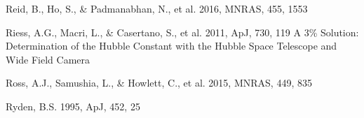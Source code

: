 \documentclass[iop]{emulateapj}
\begin{document}
\begin{thebibliography}{}

Reid, B., Ho, S., \& Padmanabhan, N., et al.  2016, MNRAS, 455, 1553


Riess, A.G., Macri, L., \& Casertano, S., et al. 2011, ApJ, 730, 119
A 3\% Solution: Determination of the Hubble Constant with the Hubble Space Telescope and Wide Field Camera


Ross, A.J., Samushia, L., \& Howlett, C., et al. 2015, MNRAS, 449, 835

Ryden, B.S. 1995, ApJ, 452, 25  













\end{thebibliography}
\end{document}
